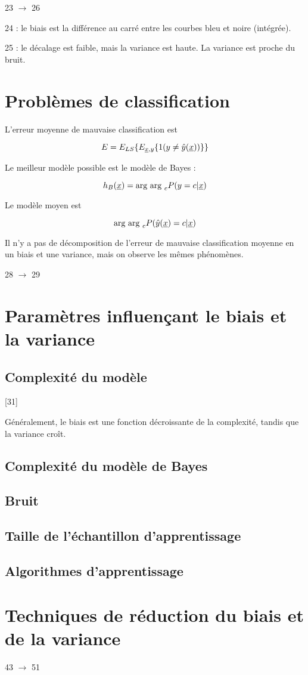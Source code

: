 	23 $\rightarrow$ 26
	
	24 : le biais est la différence au carré entre les courbes bleu et noire (intégrée).
	
	25 : le décalage est faible, mais la variance est haute. La variance est proche du bruit.
	
	
	\section{Problèmes de classification}
	
	L'erreur moyenne de mauvaise classification est
	
	$$E = E_{LS}\{E_{\underline{x}, y}\{1 (y \neq \hat{y}(\underline{x}))\}\}$$
	
	Le meilleur modèle possible est le modèle de Bayes :
	
	$$h_B(\underline{x}) = \text{arg } \text{arg }_c P(y = c \vert \underline{x})$$
	
	Le modèle moyen est
	
	$$\text{arg } \text{arg }_c P(\hat{y}(\underline{x}) = c \vert \underline{x})$$
	
	Il n'y a pas de décomposition de l'erreur de mauvaise classification moyenne en un biais et une variance, mais on observe les mêmes phénomènes.
	
	28 $\rightarrow$ 29
	
	\section{Paramètres influençant le biais et la variance}
	
		\subsection{Complexité du modèle}
		[31]
		
		
		Généralement, le biais est une fonction décroissante de la complexité, tandis que la variance croît.
		
		\subsection{Complexité du modèle de Bayes}
		
		
		\subsection{Bruit}
		
		
		\subsection{Taille de l'échantillon d'apprentissage}
		
		
		\subsection{Algorithmes d'apprentissage}
		
		
	\section{Techniques de réduction du biais et de la variance}
	
	43 $\rightarrow$ 51